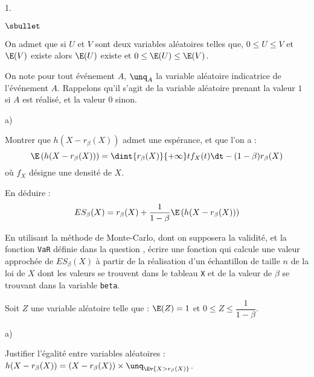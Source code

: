 \begin{noliste}{1.}
\begin{noliste}{$\sbullet$}
    \item On admet que si $U$ et $V$ sont deux variables 
    aléatoires telles que, $0 \leq U \leq V$ et $\E(V)$ existe 
    alors $\E(U)$ existe et $0 \leq \E(U) \leq \E(V)$.
    
    \item On note pour tout événement $A$, 
    $\unq_A$ la variable aléatoire indicatrice de 
    l'événement $A$. Rappelons qu'il s'agit de la variable 
    aléatoire prenant la valeur $1$ si $A$ est réalisé, et la 
    valeur $0$ sinon.
  \end{noliste}
  
  \item
  \begin{noliste}{a)}
    \setlength{\itemsep}{2mm}
    \item Montrer que $h(X-r_\beta(X))$ admet une espérance, et 
    que l'on a :
    \[
      \E\left(h(X-r_\beta(X))\right)=\dint{r_\beta(X)}{+\infty} t 
      f_X(t) \dt - (1-\beta)r_\beta(X)
    \]
    où $f_X$ désigne une densité de $X$.
    
    

    
    \item En déduire : 
    \[
      ES_\beta(X)=r_\beta(X)+\dfrac{1}{1-\beta} 
      \E\left(h(X-r_\beta(X))\right)
    \]
    
    
  \end{noliste}
  
  
  
  
  
  
  \item En utilisant la méthode de Monte-Carlo, dont on supposera 
  la validité, et la fonction {\tt VaR} définie dans la question 
  , écrire une fonction \Scilab{} qui calcule une valeur 
  approchée de $ES_\beta(X)$ à partir de la réalisation d'un 
  échantillon de taille $n$ de la loi de $X$ dont les valeurs se 
  trouvent dans le tableau \Scilab{} {\tt X} et de la valeur de 
  $\beta$ se trouvant dans la variable \Scilab{} {\tt beta}.
  
  
  \newpage
  
  
  
  \item Soit $Z$ une variable aléatoire telle que : 
  $\E(Z)=1$ et $0\leq Z \leq \dfrac1{1-\beta}$.
  \begin{noliste}{a)}
    \setlength{\itemsep}{2mm}
    \item Justifier l'égalité entre variables aléatoires : 
    $h(X-r_\beta(X))=(X-r_\beta(X)) \times \unq_{\Ev{X > 
    r_\beta(X)}}$.
    

\end{noliste}
\end{noliste}

